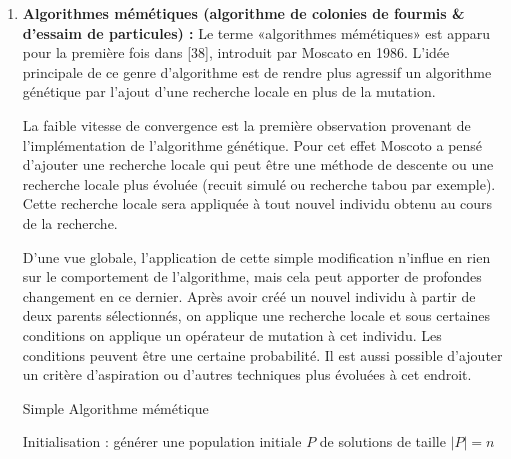 \begin{enumerate}[label=\alph*)]
	\item \textbf{Algorithmes mémétiques (algorithme de colonies de fourmis \& d’essaim de particules) : }
Le terme «algorithmes mémétiques»  est apparu pour la première fois dans [38], introduit par Moscato en 1986. L’idée principale de ce genre d’algorithme est de rendre plus agressif un algorithme génétique par l’ajout d’une recherche locale en plus de la mutation.

La faible vitesse de convergence est la première observation provenant de l’implémentation de l’algorithme génétique. Pour cet effet Moscoto a pensé d’ajouter une recherche locale  qui peut être une méthode de descente ou une recherche locale plus évoluée (recuit simulé ou recherche tabou par exemple). Cette recherche locale sera appliquée à tout nouvel individu obtenu au cours de la recherche.

D’une vue globale, l’application de cette simple modification n’influe en rien sur le comportement de l’algorithme, mais  cela peut apporter de profondes changement en ce dernier. Après avoir créé un nouvel individu à partir de deux parents sélectionnés, on applique une recherche locale et sous certaines conditions on applique un opérateur de mutation à cet individu. Les conditions peuvent être une certaine probabilité. Il est aussi possible d’ajouter un critère d’aspiration ou d’autres techniques plus évoluées à cet endroit.\\


\begin{algorithm}[H]
\caption{Simple Algorithme mémétique}
\SetAlgoLined
\DontPrintSemicolon

Initialisation : générer une population initiale $P$ de solutions de taille $| P | = n$  \;

\end{algorithm}


\end{enumerate}
